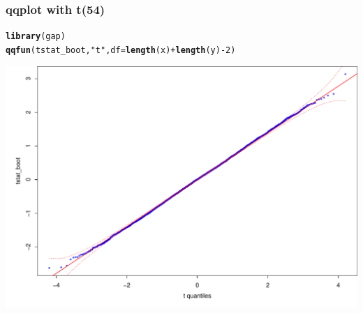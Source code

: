 \documentclass{beamer}\usepackage[]{graphicx}\usepackage[]{color}
\makeatletter
\newcommand{\hlnum}[1]{\textcolor[rgb]{0.2,0.2,0.2}{#1}}%
\newcommand{\hlstr}[1]{\textcolor[rgb]{0.2,0.2,0.2}{#1}}%
\newcommand{\hlopt}[1]{\textcolor[rgb]{0.102,0.102,0.102}{#1}}%
\newcommand{\hlstd}[1]{\textcolor[rgb]{0.102,0.102,0.102}{#1}}%
\newcommand{\hlkwc}[1]{\textcolor[rgb]{0.2,0.2,0.2}{#1}}%
\newcommand{\hlkwd}[1]{\textcolor[rgb]{0.102,0.102,0.102}{\textbf{#1}}}%
\newenvironment{kframe}{%
 \def\at@end@of@kframe{}%
 \ifinner\ifhmode%
  \def\at@end@of@kframe{\end{minipage}}%
  \begin{minipage}{\columnwidth}%
 \fi\fi%
 \def\FrameCommand##1{\hskip\@totalleftmargin \hskip-\fboxsep
 \colorbox{shadecolor}{##1}\hskip-\fboxsep
     \hskip-\linewidth \hskip-\@totalleftmargin \hskip\columnwidth}%
 \MakeFramed {\advance\hsize-\width
   \@totalleftmargin\z@ \linewidth\hsize
   \@setminipage}}%
 {\par\unskip\endMakeFramed%
 \at@end@of@kframe}
\newenvironment{knitrout}{}{} %
\renewenvironment{knitrout}{\begin{spacing}{0.75}\begin{tiny}}{\end{tiny}\end{spacing}}
\makeatother
\begin{document}
\begin{frame}[fragile]
\frametitle{qqplot with t(54)}

\begin{knitrout}\small
{}\color{fgcolor}\begin{kframe}
\begin{alltt}
\hlkwd{library}\hlstd{(gap)}
\hlkwd{qqfun}\hlstd{(tstat_boot,} \hlstr{"t"}\hlstd{,} \hlkwc{df}\hlstd{=}\hlkwd{length}\hlstd{(x)}\hlopt{+}\hlkwd{length}\hlstd{(y)}\hlopt{-}\hlnum{2}\hlstd{)}
\end{alltt}
\end{kframe}

{\centering \includegraphics[width=0.99\linewidth]{figure/graphics-unnamed-chunk-8-1} 

}



\end{knitrout}

\end{frame}
\end{document}
